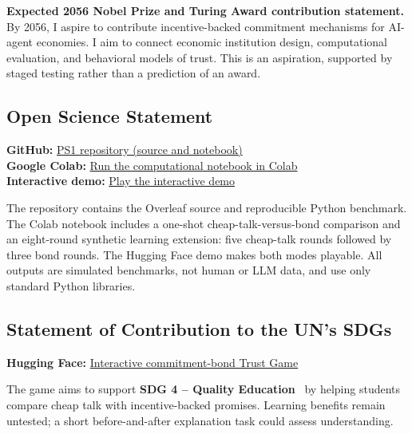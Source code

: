 \noindent
\textbf{Expected 2056 Nobel Prize and Turing Award
contribution statement.}
By 2056, I aspire to contribute incentive-backed
commitment mechanisms for AI-agent economies.
I aim to connect economic institution design,
computational evaluation, and behavioral models of
trust. This is an aspiration, supported by staged
testing rather than a prediction of an award.

\subsection*{Open Science Statement}
\textbf{GitHub:} \href{https://github.com/TemurAkhtamjonov/ps1-overleaf-template}{PS1 repository (source and notebook)}\\
\textbf{Google Colab:} \href{https://colab.research.google.com/drive/1EwIGvrd73aRVu7Y1Rci-PaBxlrlTwzzC}{Run the computational notebook in Colab}\\
\textbf{Interactive demo:} \href{https://huggingface.co/spaces/dku-comsci-econ206-2026/commitment-bond-trust-game}{Play the interactive demo}

The repository contains the Overleaf source and reproducible Python benchmark. The Colab notebook includes a one-shot cheap-talk-versus-bond comparison and an eight-round synthetic learning extension: five cheap-talk rounds followed by three bond rounds. The Hugging Face demo makes both modes playable. All outputs are simulated benchmarks, not human or LLM data, and use only standard Python libraries.

\subsection*{Statement of Contribution to the UN's SDGs}
\textbf{Hugging Face:} \href{https://huggingface.co/spaces/dku-comsci-econ206-2026/commitment-bond-trust-game}{Interactive commitment-bond Trust Game}

The game aims to support
\textbf{SDG 4 -- Quality Education}~\cite{sdg4}
by helping students compare cheap talk with
incentive-backed promises. Learning benefits remain
untested; a short before-and-after explanation task
could assess understanding.